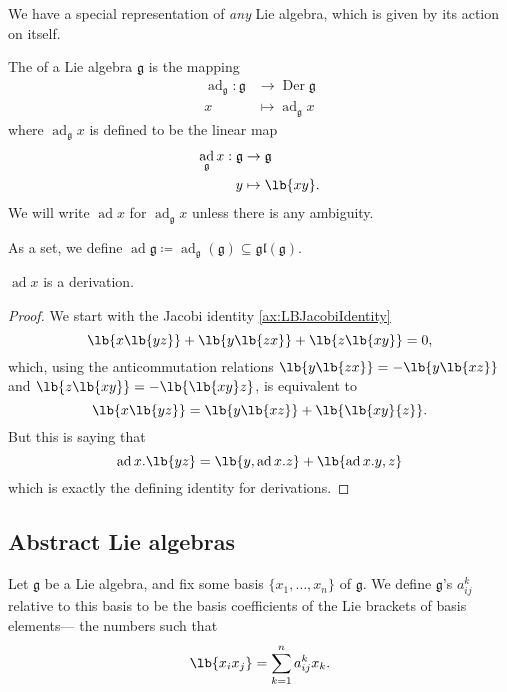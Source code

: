\documentclass{article}
\DeclarePairedDelimiter\lb\lbrack\rbrack
\DeclareMathOperator{\Der}{Der}
\DeclareMathOperator{\ad}{ad}
\newcommand*\frkg{{\ensuremath{\mathfrak{g}}}}
\newcommand*\gl{\ensuremath{\mathfrak{gl}}}
\newcommand*\acts{.}
\begin{document}
We have a special representation of \textit{any} Lie algebra, which is given by its action on itself.

\begin{definition}
    The  of a Lie algebra $\frkg$ is the mapping
    \begin{align*}
        \ad_\frkg:
        \frkg 
        &\to
        \Der \frkg
        \\
        x 
        &\mapsto 
        \ad_\frkg x
    \end{align*}
    where $\ad_\frkg x$ is defined to be the linear map
    \begin{align*}
        \ad_\frkg x: 
        \frkg 
        &\to 
        \frkg \\
        y 
        &\mapsto
        \lb{xy}.
    \end{align*}
    We will write $\ad x$ for $\ad_\frkg x$ unless there is any ambiguity.

    As a set, we define $\ad \frkg \coloneq \ad_\frkg(\frkg) \subseteq \gl(\frkg)$.
\end{definition}

\begin{proposition}
    $\ad x$ is a derivation.
\end{proposition}
\begin{proof}
    We start with the Jacobi identity \ref{ax:LBJacobiIdentity}
    \[
        \lb{x\lb{yz}} + \lb{y\lb{zx}} + \lb{z\lb{xy}}
        =
        0,
    \]
    which, using the anticommutation relations $\lb{y\lb{zx}} = -\lb{y\lb{xz}}$ and $\lb{z\lb{xy}} = -\lb{\lb{xy}z}$, is equivalent to
    \[
        \lb{x\lb{yz}}
        =
        \lb{y\lb{xz}} + \lb{\lb{xy}{z}}.
    \]
    But this is saying that
    \[
        \ad x \acts \lb{yz}
        =
        \lb{y, \ad x \acts z}
        +
        \lb{\ad x \acts y, z}
    \]
    which is exactly the defining identity for derivations.
\end{proof}


\subsection{Abstract Lie algebras}

\begin{definition}
    Let $\frkg$ be a Lie algebra, and fix some basis $\{x_1,\ldots,x_n\}$ of $\frkg$.
    We define $\frkg$'s  $a^k_{ij}$ relative to this basis to be the basis coefficients of the Lie brackets of basis elements--- the numbers such that
    \[
        \lb{x_ix_j}
        =
        \sum_{k=1}^n
        a^k_{ij}
        x_k.
    \]
\end{definition}
\end{document}
